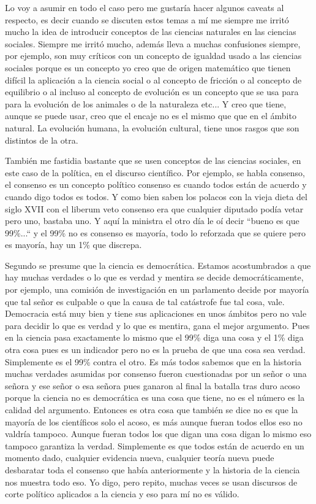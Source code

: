 Lo voy a asumir en todo el caso pero me gustaría hacer algunos caveats al respecto, es decir cuando se discuten estos temas a mí me siempre me irritó mucho la idea de introducir conceptos de las ciencias naturales en las ciencias sociales. Siempre me irritó mucho, además lleva a muchas confusiones siempre, por ejemplo, son muy críticos con un concepto de igualdad usado a las ciencias sociales porque es un concepto yo creo que de origen matemático que tienen difícil la aplicación a la ciencia social o al concepto de fricción o al concepto de equilibrio o al incluso al concepto de evolución es un concepto que se usa para para la evolución de los animales o de la naturaleza etc... Y creo que tiene, aunque se puede usar, creo que el encaje no es el mismo que que en el ámbito natural. La evolución humana, la evolución cultural, tiene unos rasgos que son distintos de la otra.

También me fastidia bastante que se usen conceptos de las ciencias sociales, en este caso de la política, en el discurso científico. Por ejemplo, se habla consenso, el consenso es un concepto político consenso es cuando todos están de acuerdo y cuando digo todos es todos. Y como bien saben los polacos con la vieja dieta del siglo XVII con el liberum veto consenso era que cualquier diputado podía vetar pero uno, bastaba uno. Y aquí la ministra el otro día le oí decir ``bueno es que 99\%...`` y el 99\% no es consenso es mayoría, todo lo reforzada que se quiere pero es mayoría, hay un 1\% que discrepa.

Segundo se presume que la ciencia es democrática. Estamos acostumbrados a que hay muchas verdades o lo que es verdad y mentira se decide democráticamente, por ejemplo, una comisión de investigación en un parlamento decide por mayoría que tal señor es culpable o que la causa de tal catástrofe fue tal cosa, vale. Democracia está muy bien y tiene sus aplicaciones en unos ámbitos pero no vale para decidir lo que es verdad y lo que es mentira, gana el mejor argumento. Pues en la ciencia pasa exactamente lo mismo que el 99\% diga una cosa y el 1\% diga otra cosa pues es un indicador pero no es la prueba de que una cosa sea verdad. Simplemente es el 99\% contra el otro. Es más todos sabemos que en la historia muchas verdades asumidas por consenso fueron cuestionadas por un señor o una señora y ese señor o esa señora pues ganaron al final la batalla tras duro acoso porque la ciencia no es democrática es una cosa que tiene, no es el número es la calidad del argumento. Entonces es otra cosa que también se dice no es que la mayoría de los científicos solo el acoso, es más aunque fueran todos ellos eso no valdría tampoco. Aunque fueran todos los que digan una cosa digan lo mismo eso tampoco garantiza la verdad. Simplemente es que todos están de acuerdo en un momento dado, cualquier evidencia nueva, cualquier teoría nueva puede desbaratar toda el consenso que había anteriormente y la historia de la ciencia nos muestra todo eso. Yo digo, pero repito, muchas veces se usan discursos de corte político aplicados a la ciencia y eso para mí no es válido.

